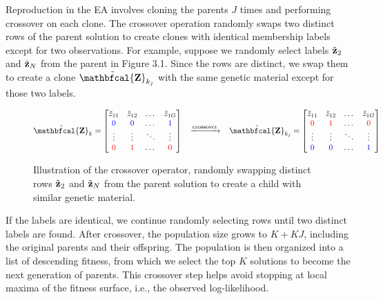 \documentclass[12pt]{report}
\begin{document}
Reproduction in the EA involves cloning the parents $J$ times and performing crossover on each clone. The crossover operation randomly swaps two distinct rows of the parent solution to create clones with identical membership labels except for two observations. For example, suppose we randomly select labels $\tilde{\bf z}_2$ and $\tilde{\bf z}_N$ from the parent in Figure 3.1. Since the rows are distinct, we swap them to create a clone $\tilde{ \bf \mathbfcal{Z} }_{k_j}$ with the same genetic material except for those two labels.  
\begin{figure}[H]
$$\tilde{\bf {\mathbfcal{Z}}}_{k} = 
\begin{bmatrix} \tilde{z}_{11} & \tilde{z}_{12} & \dots & \tilde{z}_{1G} \\
    \textcolor{blue}{0} & \textcolor{blue}{0} & \dots & \textcolor{blue}{1} \\
    \vdots & \vdots & \ddots & \vdots \\
    \textcolor{red}{0}&\textcolor{red}{1}& \dots & \textcolor{red}{0}\\
\end{bmatrix} 
\;
\;
\;
\xrightarrow{\text{crossover}}
\;
\;
\;
\tilde{ \bf \mathbfcal{Z} }_{k_j} = 
\begin{bmatrix}
    \tilde{z}_{11} & \tilde{z}_{12} & \dots & \tilde{z}_{1G} \\
    \textcolor{red}{0} & \textcolor{red}{1} & \dots & \textcolor{red}{0} \\
    \vdots & \vdots & \ddots & \vdots \\
    \textcolor{blue}{0}&\textcolor{blue}{0}& \dots & \textcolor{blue}{1}\\
\end{bmatrix}   $$
\vspace{-0.5cm}
\caption{Illustration of the crossover operator, randomly swapping distinct rows $\tilde{\bf z}_2$ and $\tilde{\bf z}_N$ from the parent solution to create a child with similar genetic material.}
\end{figure}

If the labels are identical, we continue randomly selecting rows until two distinct labels are found. After crossover, the population size grows to $K + KJ$, including the original parents and their offspring. The population is then organized into a list of descending fitness, from which we select the top $K$ solutions to become the next generation of parents. This crossover step helps avoid stopping at local maxima of the fitness surface, i.e., the observed log-likelihood. 
\end{document}
